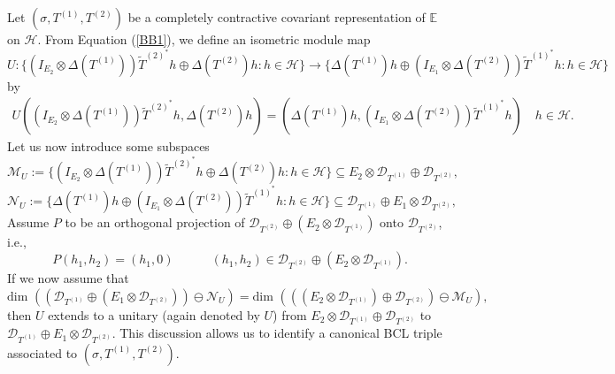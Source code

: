 \documentclass[12pt]{amsart}
\numberwithin{equation}{section}
\theoremstyle{plain}
\newcommand{\be}{\mathbb E}
\newcommand{\ot}{\otimes}
\newcommand{\wt}{\widetilde}
\newcommand{\wT}{\wt{T}}
\begin{document}
Let $(\sigma, T^{(1)}, T^{(2)})$ be a completely contractive covariant representation of $\be$ on $\mathcal H.$ From Equation (\ref{BB1}), we define an isometric module map $$U:\{(I_{E_2} \ot \Delta(T^{(1)}))\wT^{(2)^*}h\oplus \Delta(T^{(2)})h: h\in \mathcal{H}\} \to \{\Delta(T^{(1)})h\oplus (I_{E_1} \ot \Delta(T^{(2)}))\wT^{(1)^*}h: h\in \mathcal{H}\}$$ by
\begin{align}\label{JJ4}
	U((I_{E_2} \ot \Delta(T^{(1)}))\wT^{(2)^*}h, \Delta(T^{(2)})h)=(\Delta(T^{(1)})h,  (I_{E_1} \ot \Delta(T^{(2)}))\wT^{(1)^*}h) \quad h\in \mathcal H. \end{align} Let us now introduce some subspaces
$$\mathcal{M}_{U}:=\{(I_{E_2} \ot \Delta(T^{(1)}))\wT^{(2)^*}h\oplus \Delta(T^{(2)})h: h\in \mathcal{H}\}\subseteq E_2\ot \mathcal{D}_{ T^{(1)}}\oplus \mathcal{D}_{ T^{(2)}},$$
$$\mathcal{N}_{U}:=\{ \Delta(T^{(1)})h \oplus (I_{E_1} \ot \Delta(T^{(2)}))\wT^{(1)^*}h : h\in \mathcal{H}\}\subseteq \mathcal{D}_{ T^{(1)}}\oplus E_1\ot \mathcal{D}_{ T^{(2)}},$$
Assume $P$ to be an orthogonal
projection of $\mathcal{D}_{ T^{(2)}} \oplus (E_2\ot \mathcal{D}_{ T^{(1)}})$ onto $ \mathcal{D}_{ T^{(2)}}$, i.e.,
\[
P(h_1,h_2) = (h_1,0) \quad \quad \quad (h_1,h_2) \in \mathcal{D}_{ T^{(2)}} \oplus (E_2\ot \mathcal{D}_{ T^{(1)}}).
\]
If we now assume that $\mbox{dim~} ((\mathcal{D}_{T^{(1)}} \oplus (E_1 \ot\mathcal{D}_{ T^{(2)}}))\ominus \mathcal{N}_{U})=\mbox{dim~} (((E_2\ot \mathcal{D}_{ T^{(1)}})\oplus \mathcal{D}_{ T^{(2)}})\ominus \mathcal{M}_{U}),$ then $U$ extends to a unitary (again denoted by $U$) from $E_2\ot \mathcal{D}_{ T^{(1)}}\oplus \mathcal{D}_{ T^{(2)}}$ to $\mathcal{D}_{ T^{(1)}}\oplus E_1\ot \mathcal{D}_{ T^{(2)}}.$ This discussion allows us to identify a canonical BCL triple associated to $(\sigma,T^{(1)}, T^{(2)}).$
\end{document}

